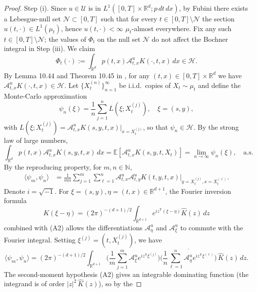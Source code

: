 \documentclass[11pt,leqno]{article}
\theoremstyle{plain}
\theoremstyle{remark}
\theoremstyle{definition}
\numberwithin{equation}{section}
\numberwithin{figure}{section}
\numberwithin{table}{section}
\begin{document}
\begin{proof}
Step (i). Since $u\in\mathcal{U}$ is in $L^1([0,T]\times\mathbb{R}^d;
p\,dt\,dx)$, by Fubini there exists a Lebesgue-null set
$\mathcal{N}\subset[0,T]$ such that for every $t\in[0,T]\setminus\mathcal{N}$
the section $u(t,\cdot)\in L^1(\mu_t)$, hence $u(t,\cdot)<\infty$
$\mu_t$-almost everywhere.  Fix any such $t\in[0,T]\setminus\mathcal{N}$;
the values of $\Phi_t$ on the null set $\mathcal{N}$ do not affect the
Bochner integral in Step (iii).  We claim
\begin{equation}\label{eq:3.3}
 \Phi_t(\cdot):=\int_{\mathbb{R}^d}p(t,x)\mathcal{A}^u_{t,x}K(\cdot, t,x)\,dx\in\mathcal{H}.
\end{equation}
By Lemma 10.44 and Theorem 10.45 in \cite{Wendland2005}, for any
$(t,x)\in [0,T]\times\mathbb{R}^d$ we have
$\mathcal{A}^u_{t,x}K(\cdot, t,x)\in\mathcal{H}$.  Let
$\{X_t^{(n)}\}_{n=1}^{\infty}$ be i.i.d.\ copies of $X_t\sim\mu_t$
and define the Monte-Carlo approximation
\[
 \psi_n(\xi)=\frac{1}{n}\sum_{j=1}^nL(\xi; X_t^{(j)}), \quad \xi=(s,y),
\]
with $L(\xi; X_t^{(j)})=\mathcal{A}^u_{t,x}K(s,y,t,x)|_{x=X_t^{(j)}}$,
so that $\psi_n\in\mathcal{H}$.  By the strong law of large numbers,
\begin{equation}\label{eq:3.4}
 \int_{\mathbb{R}^d}p(t,x)\mathcal{A}^u_{t,x}K(s,y,t,x)\,dx
 = \mathbb{E}\left[\mathcal{A}^u_{t,x}K(s,y,t,X_t)\right]
 = \lim_{n\to\infty}\psi_n(\xi), \quad\text{a.s.}
\end{equation}
By the reproducing property, for $m,n\in\mathbb{N}$,
\begin{align*}
 \langle \psi_m, \psi_n\rangle
 &= \frac{1}{mn}\sum_{j=1}^m\sum_{\ell=1}^n
      \mathcal{A}^u_{t,x}\mathcal{A}^u_{t,y}K(t,y,t,x)
      \bigr|_{y=X_t^{(j)}, x=X_t^{(\ell)}}.
\end{align*}
Denote $i=\sqrt{-1}$. For $\xi=(s,y), \eta=(t,x)\in\mathbb{R}^{d+1}$,
the Fourier inversion formula
\[
 K(\xi-\eta)=(2\pi)^{-(d+1)/2}\int_{\mathbb{R}^{d+1}}e^{iz^{\mathsf{T}}(\xi-\eta)}\widehat{K}(z)\,dz
\]
combined with (A2) allows the differentiations $\mathcal{A}^u_\eta$
and $\mathcal{A}^u_\xi$ to commute with the Fourier integral.  Setting
$\xi^{(j)}=(t,X_t^{(j)})$, we have 
\[
\langle \psi_m,\psi_n\rangle = (2\pi)^{-(d+1)/2}\int_{\mathbb{R}^{d+1}}
 \Biggl(\frac{1}{m}\sum_{j=1}^m\mathcal{A}^u_\xi e^{iz^{\mathsf{T}}\xi^{(j)}}\Biggr)
 \overline{\Biggl(\frac{1}{n}\sum_{\ell=1}^n\mathcal{A}^u_\eta e^{iz^{\mathsf{T}}\xi^{(\ell)}}\Biggr)}
 \,\widehat{K}(z)\,dz.
\]
The second-moment hypothesis (A2) gives an integrable dominating
function (the integrand is of order $|z|^2\,\widehat K(z)$), so by the

\end{proof}
\end{document}
